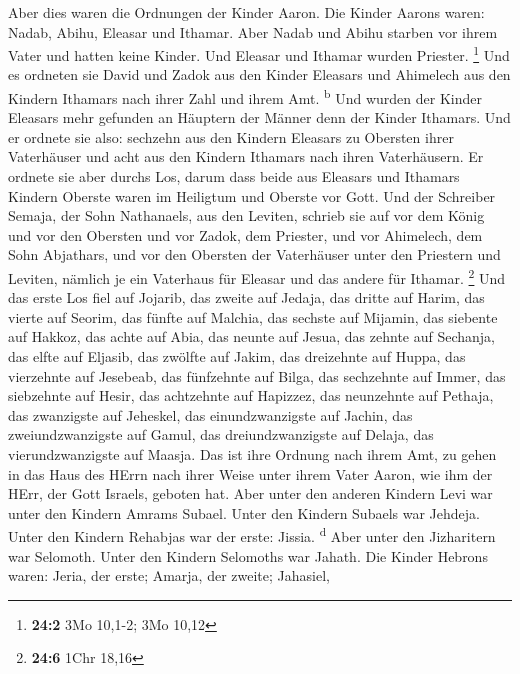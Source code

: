  Aber dies waren die Ordnungen der Kinder Aaron. Die
Kinder Aarons waren: Nadab, Abihu, Eleasar und Ithamar. 
Aber Nadab und Abihu starben vor ihrem Vater und hatten keine Kinder.
Und Eleasar und Ithamar wurden Priester. \footnote{\textbf{24:2} 3Mo
  10,1-2; 3Mo 10,12}  Und es ordneten sie David und Zadok
aus den Kinder Eleasars und Ahimelech aus den Kindern Ithamars nach
ihrer Zahl und ihrem Amt. \textsuperscript{b}  Und wurden
der Kinder Eleasars mehr gefunden an Häuptern der Männer denn der Kinder
Ithamars. Und er ordnete sie also: sechzehn aus den Kindern Eleasars zu
Obersten ihrer Vaterhäuser und acht aus den Kindern Ithamars nach ihren
Vaterhäusern.  Er ordnete sie aber durchs Los, darum dass
beide aus Eleasars und Ithamars Kindern Oberste waren im Heiligtum und
Oberste vor Gott.  Und der Schreiber Semaja, der Sohn
Nathanaels, aus den Leviten, schrieb sie auf vor dem König und vor den
Obersten und vor Zadok, dem Priester, und vor Ahimelech, dem Sohn
Abjathars, und vor den Obersten der Vaterhäuser unter den Priestern und
Leviten, nämlich je ein Vaterhaus für Eleasar und das andere für
Ithamar. \footnote{\textbf{24:6} 1Chr 18,16}  Und das
erste Los fiel auf Jojarib, das zweite auf Jedaja,  das
dritte auf Harim, das vierte auf Seorim,  das fünfte auf
Malchia, das sechste auf Mijamin,  das siebente auf
Hakkoz, das achte auf Abia,  das neunte auf Jesua, das
zehnte auf Sechanja,  das elfte auf Eljasib, das zwölfte
auf Jakim,  das dreizehnte auf Huppa, das vierzehnte auf
Jesebeab,  das fünfzehnte auf Bilga, das sechzehnte auf
Immer,  das siebzehnte auf Hesir, das achtzehnte auf
Hapizzez,  das neunzehnte auf Pethaja, das zwanzigste auf
Jeheskel,  das einundzwanzigste auf Jachin, das
zweiundzwanzigste auf Gamul,  das dreiundzwanzigste auf
Delaja, das vierundzwanzigste auf Maasja.  Das ist ihre
Ordnung nach ihrem Amt, zu gehen in das Haus des HErrn nach ihrer Weise
unter ihrem Vater Aaron, wie ihm der HErr, der Gott Israels, geboten
hat.  Aber unter den anderen Kindern Levi war unter den
Kindern Amrams Subael. Unter den Kindern Subaels war Jehdeja.
 Unter den Kindern Rehabjas war der erste: Jissia.
\textsuperscript{d}  Aber unter den Jizharitern war
Selomoth. Unter den Kindern Selomoths war Jahath.  Die
Kinder Hebrons waren: Jeria, der erste; Amarja, der zweite; Jahasiel,
